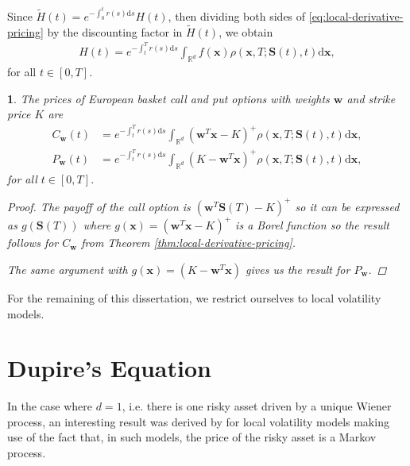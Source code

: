 \documentclass[english]{article}
\numberwithin{equation}{section}
\numberwithin{figure}{section}
\theoremstyle{bolddescit}
\theoremstyle{definition}
\theoremstyle{definition}
\theoremstyle{plain}
\theoremstyle{plain}
\newtheorem{corollary}[theorem]{\protect\corollaryname}
\theoremstyle{bolddesc}
\theoremstyle{plain}
\theoremstyle{remark}
\providecommand{\corollaryname}{Corollary}
\begin{document}
Since $\widetilde{H}(t) = e^{-\int_0^t r(s) \mathrm{d}s} H(t)$, then dividing both sides of \eqref{eq:local-derivative-pricing} by the discounting factor in $\widetilde{H}(t)$, we obtain
\begin{align*}
  H(t) = e^{-\int_t^T r(s) \mathrm{d}s} \int_{\mathbb{R}^d} f(\mathbf{x}) \rho(\mathbf{x},T;\mathbf{S}(t),t) \mathrm{d}\mathbf{x},
\end{align*}
for all $t \in [0,T]$.

\begin{corollary}\label{cor:local-option-pricing}
  The prices of European basket call and put options with weights $\mathbf{w}$ and strike price $K$ are
  \begin{align*}
    C_\mathbf{w}(t)
    &= e^{-\int_t^T r(s) \mathrm{d}s} \int_{\mathbb{R}^d} \left(\mathbf{w}^T\mathbf{x} - K\right)^+ \rho(\mathbf{x},T;\mathbf{S}(t),t) \mathrm{d}\mathbf{x},\\
    P_\mathbf{w}(t)
    &= e^{-\int_t^T r(s) \mathrm{d}s} \int_{\mathbb{R}^d} \left(K - \mathbf{w}^T\mathbf{x}\right)^+ \rho(\mathbf{x},T;\mathbf{S}(t),t) \mathrm{d}\mathbf{x},
  \end{align*}
  for all $t \in [0,T]$.

  \begin{proof}
    The payoff of the call option is $(\mathbf{w}^T \mathbf{S}(T) - K)^+$ so it can be expressed as $g(\mathbf{S}(T))$ where $g(\mathbf{x}) = (\mathbf{w}^T \mathbf{x} - K)^+$ is a Borel function so the result follows for $C_\mathbf{w}$ from Theorem \ref{thm:local-derivative-pricing}.

    The same argument with $g(\mathbf{x}) = (K - \mathbf{w}^T \mathbf{x})$ gives us the result for $P_\mathbf{w}$.
  \end{proof}
\end{corollary}

For the remaining of this dissertation, we restrict ourselves to local volatility models.

\section{Dupire's Equation}


In the case where $d=1$, i.e. there is one risky asset driven by a unique Wiener process, an interesting result was derived by \textcite{dupire_pricing_1993} for local volatility models making use of the fact that, in such models, the price of the risky asset is a Markov process.
\end{document}
